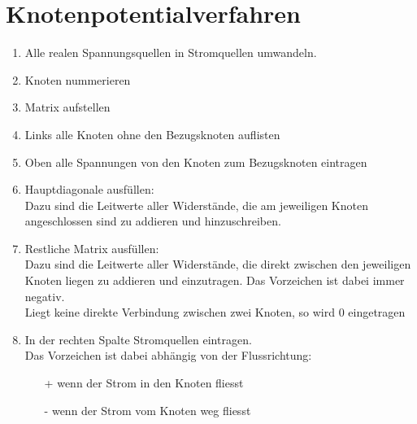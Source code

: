 



\section{Knotenpotentialverfahren}
\begin{enumerate}
  \item Alle realen Spannungsquellen in Stromquellen umwandeln. 
  \item Knoten nummerieren
  \item Matrix aufstellen
  \item Links alle Knoten ohne den Bezugsknoten auflisten
  \item Oben alle Spannungen von den Knoten zum Bezugsknoten eintragen
  \item Hauptdiagonale ausfüllen: \\
  Dazu sind die Leitwerte aller Widerstände, die am jeweiligen Knoten angeschlossen sind zu addieren und hinzuschreiben. 
  \item Restliche Matrix ausfüllen: \\
  Dazu sind die Leitwerte aller Widerstände, die direkt zwischen den jeweiligen Knoten liegen zu addieren und einzutragen. Das Vorzeichen ist dabei immer negativ. \\
  Liegt keine direkte Verbindung zwischen zwei Knoten, so wird 0 eingetragen
  \item In der rechten Spalte Stromquellen eintragen. \\
  Das Vorzeichen ist dabei abhängig von der Flussrichtung: \\
  \begin{itemize}
    \item[+] wenn der Strom in den Knoten fliesst
    \item[-] wenn der Strom vom Knoten weg fliesst
  \end{itemize}
\end{enumerate}